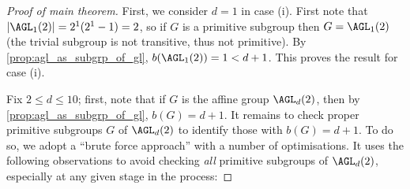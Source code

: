 \begin{proof}[Proof of main theorem]
    First, we consider $d = 1$ in case (i). First note that $|\AGL_1(2)| = 2^1(2^1 - 1) = 2$, so if $G$ is a primitive subgroup then $G = \AGL_1(2)$ (the trivial subgroup is not transitive, thus not primitive). By \autoref{prop:agl_as_subgrp_of_gl}, $b(\AGL_1(2)) = 1 < d + 1$. This proves the result for case (i).

    Fix $2 \leq d \leq 10$; first, note that if $G$ is the affine group $\AGL_d(2)$, then by \autoref{prop:agl_as_subgrp_of_gl}, $b(G) = d + 1$. It remains to check proper primitive subgroups $G$ of $\AGL_d(2)$ to identify those with $b(G) = d + 1$. To do so, we adopt a ``brute force approach'' with a number of optimisations. It uses the following observations to avoid checking \textit{all} primitive subgroups of $\AGL_d(2)$, especially at any given stage in the process:


\end{proof}
